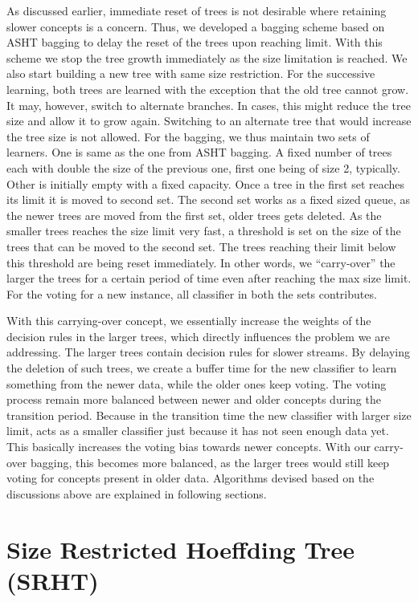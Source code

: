 As discussed earlier,  immediate reset of trees is not desirable where retaining  slower concepts is a concern. Thus, we developed a bagging scheme based on ASHT bagging to delay the reset of the trees upon reaching limit. With this scheme we stop the tree growth immediately as the size limitation is reached. We also start building a new tree with same size restriction. For the successive learning, both trees are learned with the exception that the old tree cannot grow. It may, however, switch to alternate branches. In cases, this might reduce the tree size and allow it to grow again. Switching to an alternate tree that would increase the tree size is not allowed. For the bagging, we thus maintain two sets of learners. One is same as the one from ASHT bagging. A fixed number of trees each with double the size of the previous one, first one being of size 2, typically. Other is initially empty with a fixed capacity. Once a tree in the first set reaches its limit it is moved to second set. The second set works as a fixed sized queue, as the newer trees are moved from the first set, older trees gets deleted. As the smaller trees reaches the size limit very fast, a threshold is set on the size of the trees that can be moved to the second set. The trees reaching their limit below this threshold are being reset immediately. In other words, we ``carry-over'' the larger the trees for a certain period of time even after reaching the max size limit. For the voting for a new instance, all classifier in both the sets contributes.

With this carrying-over concept, we essentially increase the weights of the decision rules in the larger trees, which directly influences the problem we are addressing. The larger trees contain decision rules for slower streams. By delaying the deletion of such trees, we create a buffer time for the new classifier to learn something from the newer data, while the older ones keep voting. The voting process remain more balanced between newer and older concepts during the transition period. Because in the transition time the new classifier with larger size limit, acts as a smaller classifier just because it has not seen enough data yet. This basically increases the voting bias towards newer concepts. With our  carry-over bagging, this becomes more balanced, as the larger trees would still keep voting for concepts present in older data. Algorithms devised based on the discussions above are explained in following sections.

\section{Size Restricted Hoeffding Tree (SRHT)}

